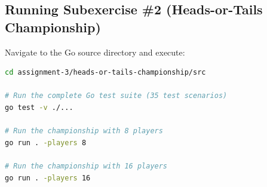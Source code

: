 \documentclass[11pt,a4paper]{article}
\begin{document}
\subsection{Running Subexercise \#2 (Heads-or-Tails Championship)}

Navigate to the Go source directory and execute:

\begin{lstlisting}[language=bash, caption={Build and execution commands for Subexercise \#2}]
cd assignment-3/heads-or-tails-championship/src

# Run the complete Go test suite (35 test scenarios)
go test -v ./...

# Run the championship with 8 players
go run . -players 8

# Run the championship with 16 players
go run . -players 16
\end{lstlisting}
\end{document}
